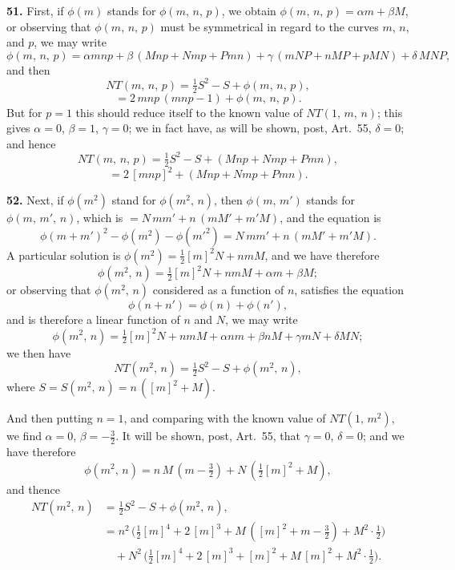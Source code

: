 \documentclass[11pt,a4paper]{article}
\begin{document}
\medskip

\textbf{51.} First, if $\phi(m)$ stands for $\phi(m,\,n,\,p)$, we obtain $\phi(m,\,n,\,p) = \alpha m + \beta M$, or observing that $\phi(m,\,n,\,p)$ must be symmetrical in regard to the curves $m$, $n$, and $p$, we may write
\[
\phi(m,\,n,\,p) = \alpha mnp + \beta\,(Mnp + Nmp + Pmn) + \gamma\,(mNP + nMP + pMN) + \delta\,MNP,
\]
and then
\[
NT(m,\,n,\,p) = \tfrac{1}{2}S^2 - S + \phi(m,\,n,\,p),
\]
\[
= 2\,mnp\,(mnp - 1) + \phi(m,\,n,\,p).
\]
But for $p = 1$ this should reduce itself to the known value of $NT(1,\,m,\,n)$; this gives $\alpha = 0$, $\beta = 1$, $\gamma = 0$; we in fact have, as will be shown, post, Art.~55, $\delta = 0$; and hence
\[
NT(m,\,n,\,p) = \tfrac{1}{2}S^2 - S + (Mnp + Nmp + Pmn),
\]
\[
= 2\,[mnp]^2 + (Mnp + Nmp + Pmn).
\]

\medskip

\textbf{52.} Next, if $\phi(m^2)$ stand for $\phi(m^2,\,n)$, then $\phi(m,\,m')$ stands for $\phi(m,\,m',\,n)$, which is $= N\,mm' + n\,(mM' + m'M)$, and the equation is
\[
\phi(m+m')^2 - \phi(m^2) - \phi(m'^2) = N\,mm' + n\,(mM' + m'M).
\]
A particular solution is $\phi(m^2) = \tfrac{1}{2}[m]^2 N + n m M$, and we have therefore
\[
\phi(m^2,\,n) = \tfrac{1}{2}[m]^2 N + n m M + \alpha m + \beta M;
\]
or observing that $\phi(m^2,\,n)$ considered as a function of $n$, satisfies the equation
\[
\phi(n+n') = \phi(n) + \phi(n'),
\]
and is therefore a linear function of $n$ and $N$, we may write
\[
\phi(m^2,\,n) = \tfrac{1}{2}[m]^2 N + n m M + \alpha n m + \beta n M + \gamma m N + \delta M N;
\]
we then have
\[
NT(m^2,\,n) = \tfrac{1}{2}S^2 - S + \phi(m^2,\,n),
\]
where $S = S(m^2,\,n) = n\,([m]^2 + M)$.

\medskip

And then putting $n = 1$, and comparing with the known value of $NT(1,\,m^2)$, we find $\alpha = 0$, $\beta = -\tfrac{3}{2}$. It will be shown, post, Art.~55, that $\gamma = 0$, $\delta = 0$; and we have therefore
\[
\phi(m^2,\,n) = n\,M\,(m - \tfrac{3}{2}) + N\,(\tfrac{1}{2}[m]^2 + M),
\]
and thence
\begin{align*}
NT(m^2,\,n) &= \tfrac{1}{2}S^2 - S + \phi(m^2,\,n),\\
&= n^2\,\bigl(\tfrac{1}{2}[m]^4 + 2\,[m]^3 + M\,([m]^2 + m - \tfrac{3}{2}) + M^2 \cdot \tfrac{1}{2}\bigr)\\
&\quad + N^2\,\bigl(\tfrac{1}{2}[m]^4 + 2\,[m]^3 + [m]^2 + M\,[m]^2 + M^2 \cdot \tfrac{1}{2}\bigr).
\end{align*}

\medskip
\end{document}

